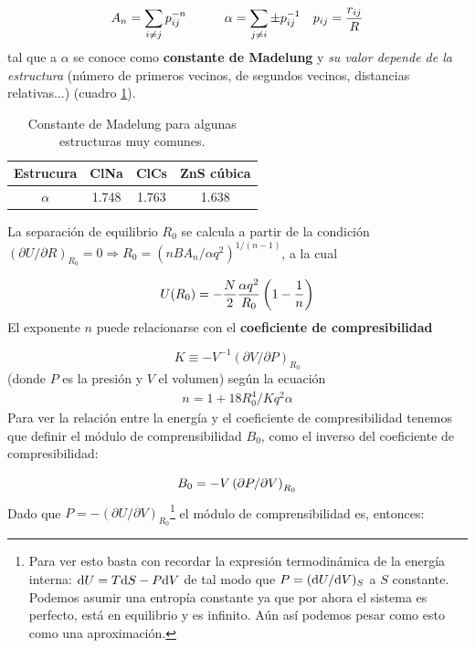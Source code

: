 \begin{equation}
    A_n = \sum_{i\neq j} p_{ij}^{-n} \quad \quad \quad \alpha = \sum_{j \neq i} \pm p_{ij}^{-1} \quad p_{ij} = \frac{r_{ij}}{R}
\end{equation}
tal que a $\alpha$ se conoce como \textbf{constante de Madelung} y \textit{su valor depende de la estructura} (número de primeros vecinos, de segundos vecinos, distancias relativas...) (cuadro \ref{Tab:03-02}).

\begin{table}[h!] \centering
    \begin{tabular}{c|ccc}
        Estrucura & ClNa & ClCs & ZnS cúbica \\ \hline
        $\alpha$ & 1.748 & 1.763 & 1.638 
    \end{tabular}
    \caption{Constante de Madelung para algunas estructuras muy comunes.}
    \label{Tab:03-02}
\end{table}

La separación de equilibrio $R_0$ se calcula a partir  de la condición $(\partial U / \partial R)_{R_0} = 0 \Rightarrow R_0 = (nBA_n/\alpha q^2)^{1/(n-1)}$, a la cual

\begin{equation}
U(R_0) = - \frac{N}{2} \frac{\alpha q^2}{R_0} \left( 1-\frac{1}{n} \right) \label{Ec:03-03-04}
\end{equation}
El exponente $n$ puede relacionarse con el \textbf{coeficiente de compresibilidad} 

\begin{equation*}
	K\equiv - V^{-1}(\partial V / \partial P)_{R_0}
\end{equation*}
(donde $P$ es la presión y $V$ el volumen) según la ecuación
\begin{eqnarray}
	n=1+18R_0^4 / Kq^2 \alpha
\end{eqnarray}
Para ver la relación entre la energía y el coeficiente de compresibilidad tenemos que definir el módulo de comprensibilidad $B_0$, como el inverso del coeficiente de compresibilidad:

\begin{equation}
	B_0 = - V \left( \partial P / \partial V \right)_{R_0}
\end{equation}
Dado que $P=-(\partial U / \partial V)_{R_0}$\footnote{Para ver esto basta con recordar la expresión termodinámica de la energía interna: $\mathrm{d} U = T \mathrm{d} S - P \mathrm{d} V$ de tal modo que $P=(\mathrm{d} U / \mathrm{d} V)_{S}$ a $S$ constante. Podemos asumir una entropía constante ya que por ahora el sistema es perfecto, está en equilibrio y es infinito. Aún así podemos pesar como esto como una aproximación.} el módulo de comprensibilidad es, entonces: 

